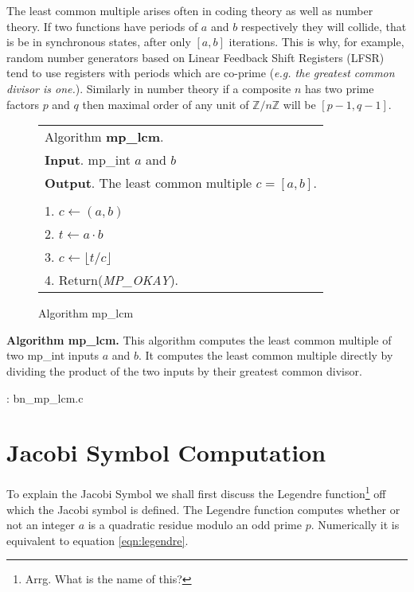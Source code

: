 \documentclass[b5paper]{book}
\def\Z{{\mathbb Z}}
\begin{document}
The least common multiple arises often in coding theory as well as number theory.  If two functions have periods of $a$ and $b$ respectively they will
collide, that is be in synchronous states, after only $[ a, b ]$ iterations.  This is why, for example, random number generators based on 
Linear Feedback Shift Registers (LFSR) tend to use registers with periods which are co-prime (\textit{e.g. the greatest common divisor is one.}).  
Similarly in number theory if a composite $n$ has two prime factors $p$ and $q$ then maximal order of any unit of $\Z/n\Z$ will be $[ p - 1, q - 1] $.

\begin{figure}[!here]
\begin{small}
\begin{center}
\begin{tabular}{l}
\hline Algorithm \textbf{mp\_lcm}. \\
\textbf{Input}.   mp\_int $a$ and $b$ \\
\textbf{Output}.  The least common multiple $c = [a, b]$.  \\
\hline \\
1.  $c \leftarrow (a, b)$ \\
2.  $t \leftarrow a \cdot b$ \\
3.  $c \leftarrow \lfloor t / c \rfloor$ \\
4.  Return(\textit{MP\_OKAY}). \\
\hline
\end{tabular}
\end{center}
\end{small}
\caption{Algorithm mp\_lcm}
\end{figure}
\textbf{Algorithm mp\_lcm.}
This algorithm computes the least common multiple of two mp\_int inputs $a$ and $b$.  It computes the least common multiple directly by
dividing the product of the two inputs by their greatest common divisor.

\vspace{+3mm}\begin{small}
\hspace{-5.1mm}{\bf File}: bn\_mp\_lcm.c
\vspace{-3mm}
\begin{alltt}
\end{alltt}
\end{small}

\section{Jacobi Symbol Computation}
To explain the Jacobi Symbol we shall first discuss the Legendre function\footnote{Arrg.  What is the name of this?} off which the Jacobi symbol is 
defined.  The Legendre function computes whether or not an integer $a$ is a quadratic residue modulo an odd prime $p$.  Numerically it is
equivalent to equation \ref{eqn:legendre}.
\end{document}
